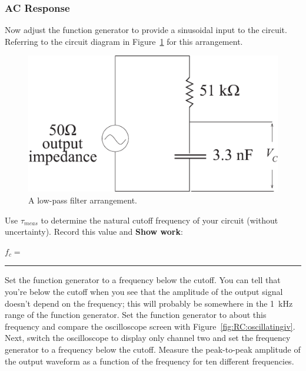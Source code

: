 \subsubsection{AC Response}
Now adjust the function generator to provide a sinusoidal input to the circuit.
Referring to the circuit diagram in Figure~\ref{fig:lowpass} for this 
arrangement. 
\begin{figure}[htb]
\epsfxsize=8cm
\centering 
\includegraphics[scale=0.35]{5_rccircuits/lowpass.eps}
\caption{A low-pass filter arrangement.}
\label{fig:lowpass}
\end{figure}
\noindent Use $\tau _{meas}$ to determine the natural cutoff frequency of your
circuit (without uncertainty).
Record this value and {\bf Show work}:
\vfill
\begin{center}
$f_c=$~ \rule{3cm}{.1mm}
\end{center}
\newpage 
\noindent Set the function generator to a 
frequency below the cutoff. You can tell that you're below the cutoff when you 
see that the amplitude of the output signal doesn't depend on the frequency;
this will probably be somewhere in the 1~kHz range of the function generator.
Set the function generator to about this frequency and compare the oscilloscope
screen with Figure~\ref{fig:RC:oscillatingiv}. 
Next, switch the oscilloscope to display only channel two and set the frequency
generator to a frequency below the cutoff. Measure the peak-to-peak amplitude of the output
waveform as a function of the frequency for ten different frequencies. \\

